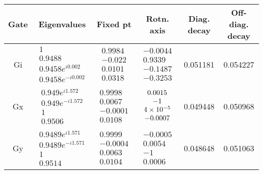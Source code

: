 {\begin{table}[h]
\begin{center}
\begin{tabular}[l]{|c|c|c|c|c|c|}
\hline
Gate & Eigenvalues & Fixed pt & Rotn. axis & Diag. decay & Off-diag. decay \\ \hline
Gi & $ \begin{array}{c}
1 \\ 
0.9488 \\ 
0.9458e^{i0.002} \\ 
0.9458e^{-i0.002}
 \end{array} $
 & $ \begin{array}{c}
0.9984 \\ 
-0.022 \\ 
0.0101 \\ 
0.0318
 \end{array} $
 & $ \begin{array}{c}
-0.0044 \\ 
0.9339 \\ 
-0.1487 \\ 
-0.3253
 \end{array} $
 & 0.051181 & 0.054227 \\ \hline
Gx & $ \begin{array}{c}
0.949e^{i1.572} \\ 
0.949e^{-i1.572} \\ 
1 \\ 
0.9506
 \end{array} $
 & $ \begin{array}{c}
0.9998 \\ 
0.0067 \\ 
-0.0001 \\ 
0.0108
 \end{array} $
 & $ \begin{array}{c}
0.0015 \\ 
-1 \\ 
4\times 10^{-5} \\ 
-0.0007
 \end{array} $
 & 0.049448 & 0.050968 \\ \hline
Gy & $ \begin{array}{c}
0.9489e^{i1.571} \\ 
0.9489e^{-i1.571} \\ 
1 \\ 
0.9514
 \end{array} $
 & $ \begin{array}{c}
0.9999 \\ 
-0.0004 \\ 
0.0063 \\ 
0.0104
 \end{array} $
 & $ \begin{array}{c}
-0.0005 \\ 
0.0054 \\ 
-1 \\ 
0.0006
 \end{array} $
 & 0.048648 & 0.051063 \\ \hline
\end{tabular}


\end{center}
\end{table}}
